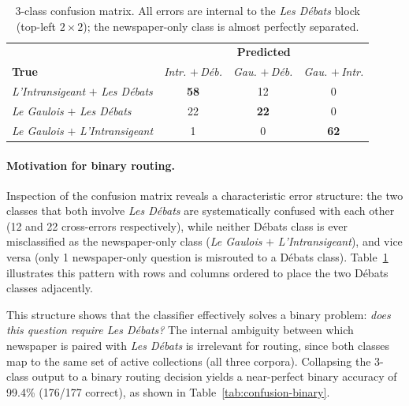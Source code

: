 \begin{table}[htbp]
\centering
\small
\setlength{\tabcolsep}{5pt}
\begin{tabular}{l ccc}
\toprule
 & \multicolumn{3}{c}{\textbf{Predicted}} \\
\cmidrule(lr){2-4}
\textbf{True}
  & \makecell{\textit{Intr.}\\$+$\,\textit{Déb.}}
  & \makecell{\textit{Gau.}\\$+$\,\textit{Déb.}}
  & \makecell{\textit{Gau.}\\$+$\,\textit{Intr.}} \\
\midrule
\textit{L'Intransigeant} $+$ \textit{Les Débats} & \textbf{58} &  12 &   0 \\
\textit{Le Gaulois} $+$ \textit{Les Débats}      &  22 & \textbf{22} &   0 \\
\textit{Le Gaulois} $+$ \textit{L'Intransigeant} &   1 &   0 & \textbf{62} \\
\bottomrule
\end{tabular}
\caption{3-class confusion matrix. All errors are internal to the \textit{Les Débats} block
(top-left $2{\times}2$); the newspaper-only class is almost perfectly separated.}
\label{tab:confusion}
\end{table}




\paragraph{Motivation for binary routing.}
Inspection of the confusion matrix reveals a characteristic error structure:
the two classes that both involve \textit{Les Débats} are systematically confused
with each other (12 and 22 cross-errors respectively), while neither Débats class
is ever misclassified as the newspaper-only class
(\textit{Le Gaulois} $+$ \textit{L'Intransigeant}), and vice versa
(only 1 newspaper-only question is misrouted to a Débats class).
Table~\ref{tab:confusion} illustrates this pattern with rows and columns ordered
to place the two Débats classes adjacently.



This structure shows that the classifier effectively solves a binary problem:
\emph{does this question require \textit{Les Débats}?}
The internal ambiguity between which newspaper is paired with \textit{Les Débats}
is irrelevant for routing, since both classes map to the same set of active
collections (all three corpora).
Collapsing the 3-class output to a binary routing decision yields a near-perfect binary accuracy of 99.4\% (176/177 correct), as shown in
Table~\ref{tab:confusion-binary}.

